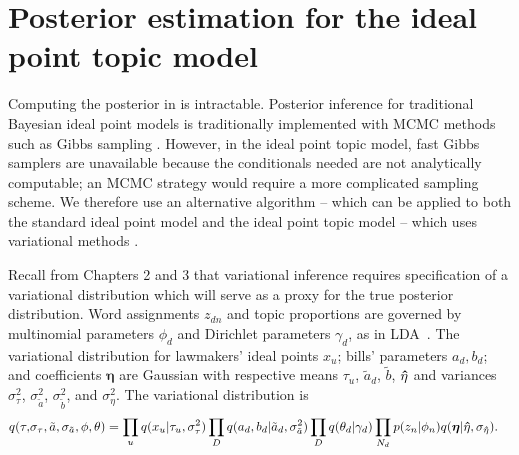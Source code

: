 






\section*{Posterior estimation for the ideal point topic model}
\label{sec:inference}
Computing the posterior in  is intractable.  Posterior
inference for traditional Bayesian ideal point models is traditionally
implemented with MCMC methods such as Gibbs sampling
\citep{johnson:1999ch6,jackman:2001,martin:2002,clinton:2004}.
However, in the ideal point topic model, fast Gibbs samplers are
unavailable because the conditionals needed are not analytically
computable; an MCMC strategy would require a more complicated sampling
scheme. We therefore use an alternative algorithm -- which can be applied
to both the standard ideal point model and the ideal point topic model
-- which uses variational methods \citep{jordan:1999}.

Recall from Chapters 2 and 3 that variational inference requires
specification of a variational distribution which will serve as a
proxy for the true posterior distribution.
Word assignments $z_{dn}$ and topic proportions are governed by
multinomial parameters $\phi_d$ and Dirichlet parameters $\gamma_d$,
as in LDA~\citep{blei:2003}.  The variational distribution for
lawmakers' ideal points $x_u$; bills' parameters $a_d, b_d$; and
coefficients $\bm \eta$ are Gaussian with respective means $\tau_u$,
${\tilde a}_d$, ${\tilde b}$, $\bm \hat \eta$ and variances $\sigma_\tau^2$,
$\sigma_{\tilde a}^2$, $\sigma_{\tilde b}^2$, and $\sigma_\eta^2$. The
variational distribution is
\begin{align}
\label{eq:var_post}
q(\tau, & \sigma_\tau, {\tilde a}, \sigma_{\tilde a}, \phi, \theta) =
  \prod_u q(x_u | \tau_u, \sigma_\tau^2 ) \prod_D q(a_d, b_d |
{\tilde a}_d, \sigma_{\tilde a}^2 )
  \prod_D q(\theta_d | \gamma_d)
  \prod_{N_d} p(z_n | \phi_n) q(\bm \eta | \bm \hat \eta, \sigma_{\bm \hat \eta}).
\end{align}

